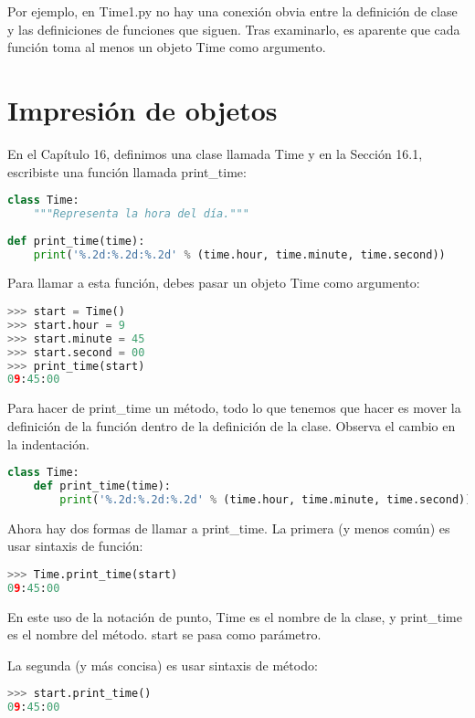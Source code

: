 Por ejemplo, en Time1.py no hay una conexión obvia entre la definición de clase y las definiciones de funciones que siguen. Tras examinarlo, es aparente que cada función toma al menos un objeto Time como argumento.

\section{Impresión de objetos}

En el Capítulo 16, definimos una clase llamada Time y en la Sección 16.1, escribiste una función llamada print\_time:

\begin{lstlisting}[language=Python]
class Time:
    """Representa la hora del día."""
    
def print_time(time):
    print('%.2d:%.2d:%.2d' % (time.hour, time.minute, time.second))
\end{lstlisting}

Para llamar a esta función, debes pasar un objeto Time como argumento:

\begin{lstlisting}[language=Python]
>>> start = Time()
>>> start.hour = 9
>>> start.minute = 45
>>> start.second = 00
>>> print_time(start)
09:45:00
\end{lstlisting}

Para hacer de print\_time un método, todo lo que tenemos que hacer es mover la definición de la función dentro de la definición de la clase. Observa el cambio en la indentación.

\begin{lstlisting}[language=Python]
class Time:
    def print_time(time):
        print('%.2d:%.2d:%.2d' % (time.hour, time.minute, time.second))
\end{lstlisting}

Ahora hay dos formas de llamar a print\_time. La primera (y menos común) es usar sintaxis de función:

\begin{lstlisting}[language=Python]
>>> Time.print_time(start)
09:45:00
\end{lstlisting}

En este uso de la notación de punto, Time es el nombre de la clase, y print\_time es el nombre del método. start se pasa como parámetro.

La segunda (y más concisa) es usar sintaxis de método:

\begin{lstlisting}[language=Python]
>>> start.print_time()
09:45:00
\end{lstlisting}

